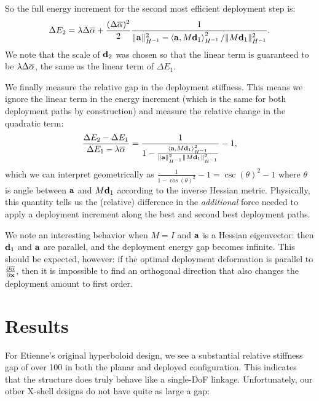 \documentclass[10pt]{article}
\begin{document}
So the full energy increment for the second most efficient deployment step is:
$$
\Delta E_2 = \lambda \Delta \overline{\alpha} + 
    \frac{(\Delta \overline{\alpha})^2}{2}
    \frac{1}{\lVert{\bf a}\rVert_{H^{-1}}^2 - \left<{\bf a}, M {\bf d}_1\right>_{H^{-1}}^2 / \lVert M {\bf d}_1\rVert_{H^{-1}}^2}.
$$
We note that the scale of ${\bf d}_2$ was chosen so that the linear term is guaranteed to be $\lambda \Delta \overline{\alpha}$,
the same as the linear term of $\Delta E_1$.

We finally measure the relative gap in the deployment stiffness. This means we
ignore the linear term in the energy increment (which is the same for both
deployment paths by construction) and measure the relative change in the quadratic term:
$$
\frac{\Delta E_2 - \Delta E_1}{\Delta E_1 - \lambda \overline{\alpha}} 
=
    \frac{1}{1 - \frac{\left<{\bf a}, M {\bf d}_1\right>_{H^{-1}}^2}{\lVert{\bf a}\rVert_{H^{-1}}^2 \lVert M {\bf d}_1\rVert_{H^{-1}}^2}} - 1,
$$
which we can interpret geometrically as 
$\frac{1}{1 - \cos(\theta)^2} - 1 = \csc(\theta)^2 - 1$ where $\theta$ is angle between ${\bf a}$ and $M {\bf d}_1$ according to the inverse Hessian metric.
Physically, this quantity tells us the (relative) difference in the \emph{additional} force needed to apply
a deployment increment along the best and second best deployment paths.

We note an interesting behavior when $M = I$ and ${\bf a}$ is a Hessian eigenvector:
then ${\bf d}_1$ and ${\bf a}$ are parallel, and the deployment energy gap becomes
infinite. This should be expected, however: if the optimal deployment
deformation is parallel to $\frac{\partial \overline{\alpha}}{\partial {\bf x}}$, then it is impossible to
find an orthogonal direction that also changes the deployment amount to first order.

\section{Results}
For Etienne's original hyperboloid design, we see a substantial relative
stiffness gap of over 100 in both the planar and deployed configuration. This
indicates that the structure does truly behave like a single-DoF linkage.
Unfortunately, our other X-shell designs do not have quite as large a gap:
\end{document}

